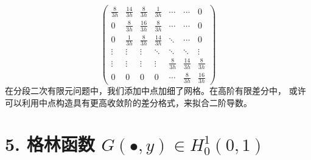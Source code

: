 \documentclass[a4paper]{article}
\begin{document}
\begin{enumerate}
\begin{equation}
\begin{pmatrix}
                    \frac{8}{3h} & \frac{14}{3h} & \frac{8}{3h} & \frac{1}{3h} & \cdots & \cdots & 0\\
                    0 & \frac{8}{3h} & \frac{16}{3h}  & \frac{8}{3h} & \cdots & \cdots & 0\\
                    0 & \frac{1}{3h} & \frac{8}{3h} & \frac{14}{3h} & \ddots & \cdots & 0\\
                    \vdots & \vdots & \vdots & \ddots & \ddots & \ddots & \vdots\\
                    \vdots & \vdots & \vdots & \vdots & \frac{8}{3h} & \frac{14}{3h} & \frac{8}{3h}\\
                    0 & 0 & 0 & 0 & \cdots & \frac{8}{3h} & \frac{16}{3h}
                \end{pmatrix}
            \end{equation}
            在分段二次有限元问题中，我们添加中点加细了网格。在高阶有限差分中，
            或许可以利用中点构造具有更高收敛阶的差分格式，来拟合二阶导数。
\end{enumerate}

\section*{5. 格林函数 $G(\bullet, y)\in H^1_0(0,1)$}
\end{document}
